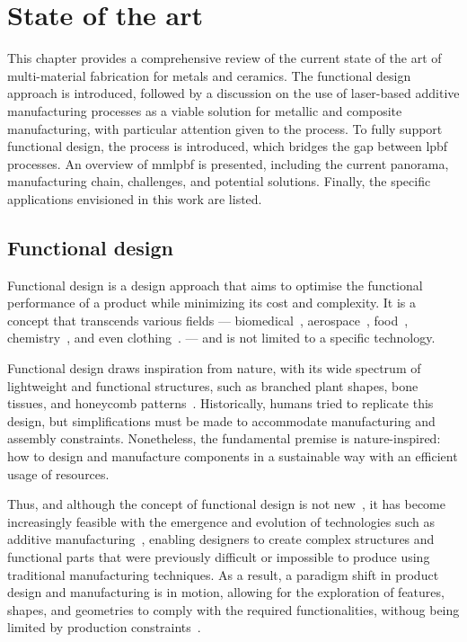 %
%
\chapter{State of the art}%
\label{ch:state-art}
This chapter provides a comprehensive review of the current state of the art of
multi-material fabrication for metals and ceramics. The functional design
approach is introduced, followed by a discussion on the use of laser-based
additive manufacturing processes as a viable solution for metallic and composite
manufacturing, with particular attention given to the  process. To
fully support functional design, the  process is introduced,
which bridges the gap between \gls{lpbf} processes. An overview of \gls{mmlpbf}
is presented, including the current panorama, manufacturing chain, challenges,
and potential solutions. Finally, the specific applications envisioned in this work are listed.

\section{Functional design}%
\label{sec:functional-design}
Functional design is a design approach that aims to optimise the functional
performance of a product while minimizing its cost and complexity. It is a
concept that transcends various fields --- biomedical~\cite{yang2017biomimetic,
  wang2016dual, el2013hydrogel}, aerospace~\cite{marques2022RocketEngine, zhu2018light, hu2017design}, food~\cite{portanguen2019toward},
chemistry~\cite{jin2023structural}, and even clothing~\cite{gupta2011design,mckinney2023inclusion}.
--- and is not limited to a specific
technology.

Functional design draws inspiration from nature, with its wide spectrum of
lightweight and functional structures, such as branched plant shapes, bone
tissues, and honeycomb patterns~\cite{anton2019-ReviewBiomimetic-AM}.
Historically, humans tried to replicate this design, but simplifications must be
made to accommodate manufacturing and assembly constraints. Nonetheless, the
fundamental premise is nature-inspired: how to design and manufacture components
in a sustainable way with an efficient usage of resources.

Thus, and although the concept of functional design is not new~\cite{chiang2001designing}, it has become
increasingly feasible with the emergence and evolution of technologies such as additive manufacturing~\cite{anton2019-ReviewBiomimetic-AM}, enabling designers
to create complex structures and functional parts that were previously difficult
or impossible to produce using traditional manufacturing techniques.
As a result, a paradigm shift in
product design and manufacturing is in motion, allowing for the exploration of
features, shapes, and geometries to comply with the required functionalities,
withoug being limited by production constraints~\cite{plocher2019review}.

